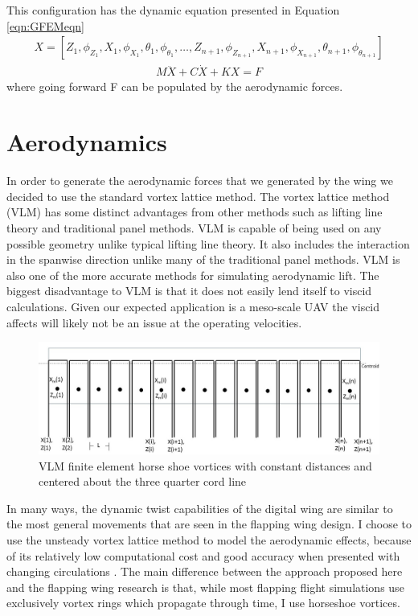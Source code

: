 \documentclass[11pt]{ucthesis}
\begin{document}
This configuration has the dynamic equation presented in Equation \ref{eqn:GFEMeqn}
\begin{eqnarray}
X = [Z_1,\phi_{Z_1}, X_1,\phi_{X_1},\theta_1,\phi_{\theta_1}, \ldots,Z_{n+1},\phi_{Z_{n+1}}, X_{n+1},\phi_{X_{n+1}},\theta_{n+1},\phi_{\theta_{n+1}}]
\end{eqnarray}
\begin{eqnarray}
M\ddot{X}+C\dot{X}+KX = F
\label{eqn:GFEMeqn}
\end{eqnarray}
where going forward F can be populated by the aerodynamic forces.

\section{Aerodynamics}
\label{sec:aeroModel}
In order to generate the aerodynamic forces that we generated by the wing we decided to use the standard vortex lattice method. The vortex lattice method (VLM) has some distinct advantages from other methods such as lifting line theory and traditional panel methods. VLM is capable of being used on any possible geometry unlike typical lifting line theory. It also includes the interaction in the spanwise direction unlike many of the traditional panel methods. VLM is also one of the more accurate methods for simulating aerodynamic lift. \cite{bertin1998aerodynamics} The biggest disadvantage to VLM is that it does not easily lend itself to viscid calculations. Given our expected application is a meso-scale UAV the viscid affects will likely not be an issue at the operating velocities.
\begin{figure}[thpb]
\centering
\includegraphics[width=1\linewidth]{Figures/VortexLaticeMethod.jpg}
\caption{VLM finite element horse shoe vortices with constant distances and centered about the three quarter cord line}
\label{fig:VLM}
\end{figure}

In many ways, the dynamic twist capabilities of the digital wing are similar to the most general movements that are seen in the flapping wing design. I choose to use the unsteady vortex lattice method to model the aerodynamic effects, because of its relatively low computational cost and good accuracy when presented with changing circulations \cite{long2004object,stanford2010analytical,de2012object}. The main difference between the approach proposed here and the flapping wing research is that, while most flapping flight simulations use exclusively vortex rings which propagate through time, I use horseshoe vortices. 
\end{document}
